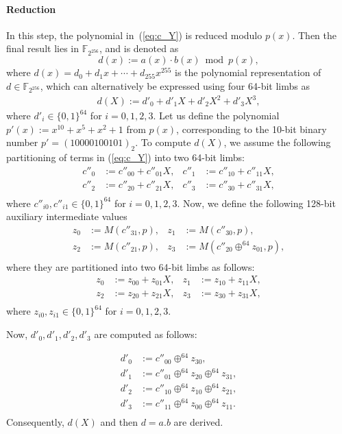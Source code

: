 \paragraph{Reduction}
In this step, the polynomial in~(\ref{eq:c_Y}) is reduced modulo \( p(x) \). Then the final result lies in \( \mathbb{F}_{2^{256}} \), and is denoted as
	\[
	d(x) := a(x) \cdot b(x) \bmod p(x),
	\]
where \( d(x) = d_0 + d_1x + \cdots + d_{255}x^{255} \) is the polynomial representation of \( d \in \mathbb{F}_{2^{256}} \), which can alternatively be expressed using four 64-bit limbs as	
\begin{align}
	d(X) := d'_0 + d'_1X + d'_2X^2 + d'_3X^3,
\end{align}
where \( d'_i \in \{0,1\}^{64} \) for \( i = 0,1,2,3 \).
Let us define the polynomial \( p'(x) := x^{10} + x^{5} + x^{2} + 1 \) from $p(x)$, corresponding to the 10-bit binary number \( p' = (10000100101)_2 \).
To compute \( d(X) \), we assume the following partitioning of terms in (\ref{eq:c_Y}) into two 64-bit limbs:
 \begin{align*}
 	c''_0 &:= c''_{00} + c''_{01}X,& c''_1 &:= c''_{10} + c''_{11}X,\\
	c''_2 &:= c''_{20} + c''_{21}X,& c''_3 &:= c''_{30} + c''_{31}X,\\
\end{align*}	
where $c''_{i0}, c''_{i1} \in \{0,1\}^{64}$ for $i=0,1,2,3$. Now, we define the following 128-bit auxiliary intermediate values
\begin{align*}
	z_0 &:= M(c''_{31},p), &	z_1 &:= M(c''_{30},p), \\
	z_2 &:= M(c''_{21},p), &	z_3 &:= M(c''_{20} \oplus^{64} z_{01} ,p), \\
\end{align*}
where they are partitioned  into two 64-bit limbs as follows:
 \begin{align*}
	z_0 &:= z_{00} + z_{01}X,& z_1 &:= z_{10} + z_{11}X,\\
	z_2 &:= z_{20} + z_{21}X,& z_3 &:= z_{30} + z_{31}X,\\
\end{align*}	
where $z_{i0}, z_{i1} \in \{0,1\}^{64}$ for $i=0,1,2,3$.
 
 
Now, $d'_0, d'_1, d'_2, d'_3$ are computed as follows:

 \begin{align*}
	d'_0 &:= c''_{00} \oplus^{64} z_{30},\\
	d'_1 &:= c''_{01} \oplus^{64} z_{20} \oplus^{64} z_{31},\\
	d'_2 &:= c''_{10} \oplus^{64} z_{10} \oplus^{64} z_{21},\\
	d'_3 &:= c''_{11} \oplus^{64} z_{00} \oplus^{64} z_{11}.\\
\end{align*}
Consequently, $d(X)$ and then $d=a.b$ are derived.